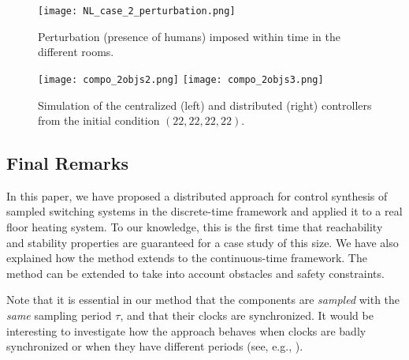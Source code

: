 \begin{figure}[ht]
 \centering
 \texttt{[image: NL\_case\_2\_perturbation.png]}
 \caption{Perturbation (presence of humans) imposed within time in the
   different rooms.}
  \label{fig:NL_2_part3_perturbation_part3}
\end{figure}


\begin{figure}[ht]
 \centering
 \texttt{[image: compo\_2objs2.png]}%
%
 \texttt{[image: compo\_2objs3.png]}
 \caption{Simulation of the centralized (left) and distributed (right) controllers from the initial condition $(22,22,22,22)$.}
  \label{fig:NL_2_part3}
\end{figure}

\subsection{Final Remarks}\label{sec:conc}

In this paper, we have proposed a distributed approach 
for control synthesis of sampled switching systems in the discrete-time framework
and applied it to a real floor heating system.
To our knowledge,
this is the first time that reachability and stability properties  
are guaranteed for a case study of this size. 
We have also explained how the method extends to the continuous-time framework.
The method can
be extended to take into account obstacles and safety constraints.

Note that it is essential in our method that the components are {\em sampled} with the {\em same} sampling period $\tau$, and that their clocks are synchronized.
It would be interesting to investigate how the approach behaves when clocks are badly synchronized or when they have different periods (see, e.g., \cite{KhatibGD16}).







